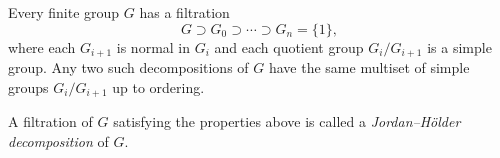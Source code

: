 \documentclass{article}
\begin{document}
Every finite group $G$ has a filtration
$$
G \supset G_0 \supset \cdots \supset G_n = \{1\},
$$
where each $G_{i+1}$ is normal in $G_i$ and each quotient group $G_i/G_{i+1}$ is a simple group. Any two such decompositions of $G$ have the same multiset of simple groups $G_i/G_{i+1}$ up to ordering.

A filtration of $G$ satisfying the properties above is called a {\em Jordan--H\"older decomposition} of $G$.
\end{document}
